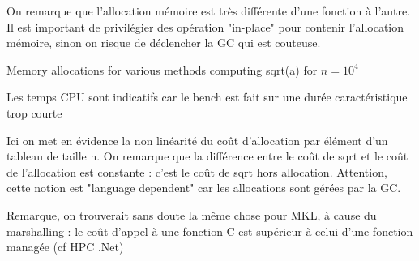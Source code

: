 On remarque que l'allocation mémoire est très différente d'une fonction à l'autre. Il est important de privilégier des opération "in-place" pour contenir l'allocation mémoire, sinon on risque de déclencher la GC qui est couteuse.

\begin{table}[]
\centering
{}
\caption{Memory allocations for various methods computing sqrt(a) for $n = 10^4$}
\end{table}


\newpage


Les temps CPU sont indicatifs car le bench est fait sur une durée caractéristique trop courte


Ici on met en évidence la non linéarité du coût d'allocation par élément d'un tableau de taille n.
On remarque que la différence entre le coût de sqrt et le coût de l'allocation est constante : c'est le coût de sqrt
hors allocation. Attention, cette notion est "language dependent" car les allocations sont gérées par la GC.



Remarque, on trouverait sans doute la même chose pour MKL, à cause du marshalling : le coût d'appel à une fonction C est supérieur à celui d'une fonction managée (cf HPC .Net)

\newpage


